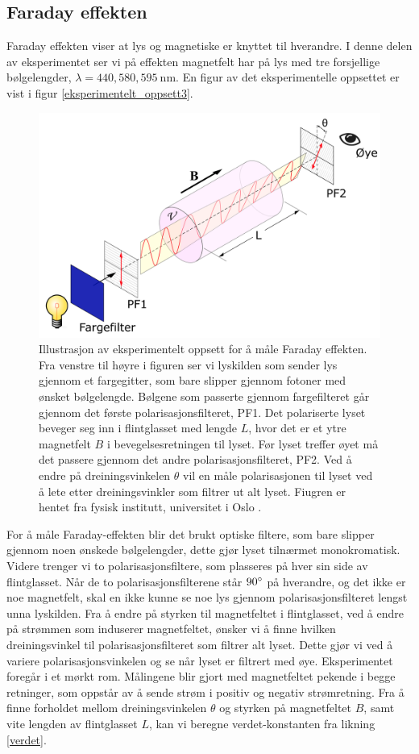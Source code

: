\documentclass[%
 reprint,
 amsmath,amssymb,
 aps,
 norsk,
]{revtex4-1}
\begin{document}
\subsection{Faraday effekten}
Faraday effekten viser at lys og magnetiske er knyttet til hverandre. I denne delen av eksperimentet ser vi på effekten magnetfelt har på lys med tre forsjellige bølgelengder, $\lambda = 440, 580, \SI{595}{\nano\meter}$. En figur av det eksperimentelle oppsettet er vist i figur \vref{eksperimentelt_oppsett3}.
\begin{figure}[h!]
  \centering
  \includegraphics[scale=0.27]{oppsett3.png}
  \caption{Illustrasjon av eksperimentelt oppsett for å måle Faraday effekten. Fra venstre til høyre i figuren ser vi lyskilden som sender lys gjennom et fargegitter, som bare slipper gjennom fotoner med ønsket bølgelengde. Bølgene som passerte gjennom fargefilteret går gjennom det første polarisasjonsfilteret, PF1. Det polariserte lyset beveger seg inn i flintglasset med lengde $L$, hvor det er et ytre magnetfelt $B$ i bevegelsesretningen til lyset. Før lyset treffer øyet må det passere gjennom det andre polarisasjonsfilteret, PF2. Ved å endre på dreiningsvinkelen $\theta$ vil en måle polarisasjonen til lyset ved å lete etter dreiningsvinkler som filtrer ut alt lyset. Fiugren er hentet fra fysisk institutt, universitet i Oslo \cite{oppgave}.}
  \label{eksperimentelt_oppsett3}
\end{figure}
For å måle Faraday-effekten blir det brukt optiske filtere, som bare slipper gjennom noen ønskede bølgelengder, dette gjør lyset tilnærmet monokromatisk. Videre trenger vi to polarisasjonsfiltere, som plasseres på hver sin side av flintglasset. Når de to polarisasjonsfilterene står $90\degree$ på hverandre, og det ikke er noe magnetfelt, skal en ikke kunne se noe lys gjennom polarisasjonsfilteret lengst unna lyskilden. Fra å endre på styrken til magnetfeltet i flintglasset, ved å endre på strømmen som induserer magnetfeltet, ønsker vi å finne hvilken dreiningsvinkel til polarisasjonsfilteret som filtrer alt lyset. Dette gjør vi ved å variere polarisasjonsvinkelen og se når lyset er filtrert med øye. Eksperimentet foregår i et mørkt rom. Målingene blir gjort med magnetfeltet pekende i begge retninger, som oppstår av å sende strøm i positiv og negativ strømretning. Fra å finne forholdet mellom dreiningsvinkelen $\theta$ og styrken på magnetfeltet $B$, samt vite lengden av flintglasset $L$, kan vi beregne verdet-konstanten fra likning \eqref{verdet}.
\end{document}
